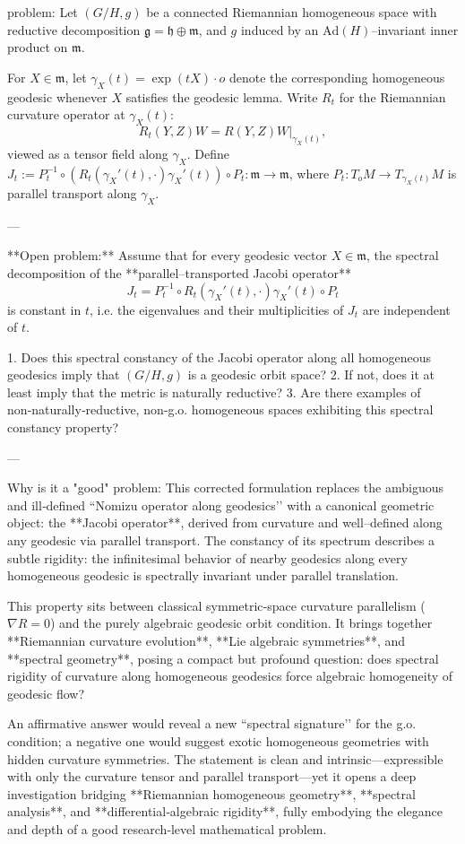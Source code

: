 problem:  
Let \( (G/H,g) \) be a connected Riemannian homogeneous space with reductive decomposition  
\(\mathfrak g = \mathfrak h \oplus \mathfrak m\), and \(g\) induced by an \( \mathrm{Ad}(H)\)–invariant inner product on \(\mathfrak m\).  

For \(X \in \mathfrak m\), let \(\gamma_X(t)=\exp(tX)\cdot o\) denote the corresponding homogeneous geodesic whenever \(X\) satisfies the geodesic lemma. Write \(R_t\) for the Riemannian curvature operator at \(\gamma_X(t)\):
\[
R_t(Y,Z)W = R(Y,Z)W|_{\gamma_X(t)},
\]
viewed as a tensor field along \(\gamma_X\). Define \(J_t := P_t^{-1}\circ (R_t(\gamma_X'(t),\cdot)\gamma_X'(t))\circ P_t:\mathfrak m\to\mathfrak m\), where \(P_t:T_oM\to T_{\gamma_X(t)}M\) is parallel transport along \(\gamma_X\).

---

**Open problem:**  
Assume that for every geodesic vector \(X\in \mathfrak m\), the spectral decomposition of the **parallel–transported Jacobi operator**
\[
J_t = P_t^{-1}\circ R_t(\gamma_X'(t),\cdot)\gamma_X'(t)\circ P_t
\]
is constant in \(t\), i.e. the eigenvalues and their multiplicities of \(J_t\) are independent of \(t\).

1. Does this spectral constancy of the Jacobi operator along all homogeneous geodesics imply that \((G/H,g)\) is a geodesic orbit space?  
2. If not, does it at least imply that the metric is naturally reductive?  
3. Are there examples of non‑naturally‑reductive, non‑g.o. homogeneous spaces exhibiting this spectral constancy property?

---

Why is it a "good" problem:  
This corrected formulation replaces the ambiguous and ill‑defined “Nomizu operator along geodesics’’ with a canonical geometric object: the **Jacobi operator**, derived from curvature and well–defined along any geodesic via parallel transport.  
The constancy of its spectrum describes a subtle rigidity: the infinitesimal behavior of nearby geodesics along every homogeneous geodesic is spectrally invariant under parallel translation.

This property sits between classical symmetric‑space curvature parallelism (\(\nabla R = 0\)) and the purely algebraic geodesic orbit condition. It brings together **Riemannian curvature evolution**, **Lie algebraic symmetries**, and **spectral geometry**, posing a compact but profound question: does spectral rigidity of curvature along homogeneous geodesics force algebraic homogeneity of geodesic flow?  

An affirmative answer would reveal a new “spectral signature’’ for the g.o. condition; a negative one would suggest exotic homogeneous geometries with hidden curvature symmetries. The statement is clean and intrinsic—expressible with only the curvature tensor and parallel transport—yet it opens a deep investigation bridging **Riemannian homogeneous geometry**, **spectral analysis**, and **differential‐algebraic rigidity**, fully embodying the elegance and depth of a good research‐level mathematical problem.